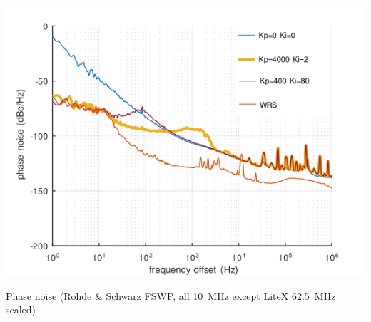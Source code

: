 \documentclass[compress,10pt,aspectratio=169]{beamer}
\begin{document}
\begin{frame}[fragile]
\begin{minipage}[t]{1.06\linewidth}
\begin{minipage}{.49\linewidth}
\end{minipage}
\begin{minipage}{.49\linewidth}
\includegraphics[width=\linewidth]{phase_noise_litex.png}

Phase noise (Rohde \& Schwarz FSWP, all 10~MHz except LiteX 62.5~MHz
scaled)
\end{minipage}
\end{minipage}


\end{frame}
\end{document}
